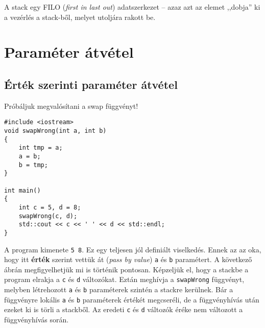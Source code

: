 \documentclass[a4paper,11.5pt,table]{article}
\begin{document}
	A stack egy FILO (\textit{first in last out}) adatszerkezet -- azaz azt az elemet ,,dobja'' ki a vezérlés a stack-ből, melyet utoljára rakott be.
	
	\section{Paraméter átvétel}
	\subsection{Érték szerinti paraméter átvétel}
	Próbáljuk megvalósítani a swap függvényt!
	\begin{lstlisting}
#include <iostream>
void swapWrong(int a, int b)
{
	int tmp = a;
	a = b;
	b = tmp;
}

int main()
{
	int c = 5, d = 8;
	swapWrong(c, d);
	std::cout << c << ' ' << d << std::endl;
}
	\end{lstlisting}		
	A program kimenete \texttt{5 8}. Ez egy teljesen jól definiált viselkedés. Ennek az az oka, hogy itt \textbf{érték} szerint vettük át (\textit{pass by value}) \texttt{a} és \texttt{b} paramétert. A következő ábrán megfigyelhetjük mi is történik pontosan. Képzeljük el, hogy a stackbe a program elrakja a \texttt{c} és \texttt{d} változókat. Eztán meghívja a \texttt{swapWrong} függvényt, melyben létrehozott \texttt{a} és \texttt{b} paraméterek szintén a stackre kerülnek. Bár a függvényre lokális \texttt{a} és \texttt{b} paraméterek értékét megcseréli, de a függvényhívás után ezeket ki is törli a stackből. Az eredeti \texttt{c} és \texttt{d} változók éréke nem változott a függvényhívás során.
\end{document}
